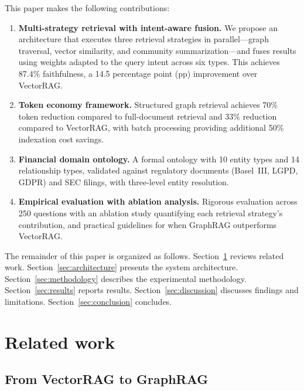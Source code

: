 \documentclass[review]{elsarticle}
\begin{document}
This paper makes the following contributions:

\begin{enumerate}
    \item \textbf{Multi-strategy retrieval with intent-aware fusion.} We propose an architecture that executes three retrieval strategies in parallel---graph traversal, vector similarity, and community summarization---and fuses results using weights adapted to the query intent across six types. This achieves 87.4\% faithfulness, a 14.5 percentage point (pp) improvement over VectorRAG.

    \item \textbf{Token economy framework.} Structured graph retrieval achieves 70\% token reduction compared to full-document retrieval and 33\% reduction compared to VectorRAG, with batch processing providing additional 50\% indexation cost savings.

    \item \textbf{Financial domain ontology.} A formal ontology with 10 entity types and 14 relationship types, validated against regulatory documents (Basel~III, LGPD, GDPR) and SEC filings, with three-level entity resolution.

    \item \textbf{Empirical evaluation with ablation analysis.} Rigorous evaluation across 250 questions with an ablation study quantifying each retrieval strategy's contribution, and practical guidelines for when GraphRAG outperforms VectorRAG.
\end{enumerate}

The remainder of this paper is organized as follows. Section~\ref{sec:related} reviews related work. Section~\ref{sec:architecture} presents the system architecture. Section~\ref{sec:methodology} describes the experimental methodology. Section~\ref{sec:results} reports results. Section~\ref{sec:discussion} discusses findings and limitations. Section~\ref{sec:conclusion} concludes.


\section{Related work}
\label{sec:related}

\subsection{From VectorRAG to GraphRAG}
\end{document}
